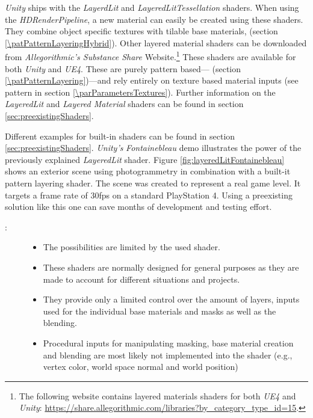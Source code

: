 \begin{description}
	\emph{Unity} ships with the \emph{LayerdLit} and \emph{LayeredLitTessellation} shaders. When using the \emph{HDRenderPipeline}, a new material can easily be created using these shaders. They combine object specific textures with tilable base materials, \emph{\patPatternLayeringHybrid} (section \ref{\patPatternLayeringHybrid}). Other layered material shaders can be downloaded from \emph{Allegorithmic's Substance Share} Website.\footnote{The following website contains layered materials shaders for both \emph{UE4} and \emph{Unity}: \url{https://share.allegorithmic.com/libraries?by_category_type_id=15}.} These shaders are available for both \emph{Unity} and \emph{UE4}. These are  purely pattern based---\emph{\patPatternLayering} (section \ref{\patPatternLayering})---and rely entirely on texture based material inputs (see pattern \emph{\parParametersTextures} in section \ref{\parParametersTextures}). Further information on the \emph{LayeredLit} and \emph{Layered Material} shaders can be found in section \ref{sec:preexistingShaders}. 
	\item[\patExamples:]%
	Different examples for built-in shaders can be found in section \ref{sec:preexistingShaders}. \emph{Unity's} \emph{Fontainebleau} \cite{fontainebleu2018} demo illustrates the power of the previously explained \emph{LayeredLit} shader. Figure \ref{fig:layeredLitFontainebleau} shows an exterior scene using photogrammetry in combination with a built-it pattern layering shader. The scene was created to represent a real game level. It targets a frame rate of 30fps on a standard PlayStation 4. Using a preexisting solution like this one can save months of development and testing effort. 
	\item[\patConsequences:]\hfill 
		\begin{description}
			\item[\visual:]\hfill
			\begin{itemize}\mynobreakpar
				\item The possibilities are limited by the used shader.
				\item These shaders are normally designed for general purposes as they are made to account for different situations and projects. 
				\item They provide only a limited control over the amount of layers, inputs used for the individual base materials and masks as well as the blending.
				\item Procedural inputs for manipulating masking, base material creation and blending are most likely not implemented into the shader (e.g., vertex color, world space normal and world position) 

\end{itemize}
\end{description}
\end{description}
